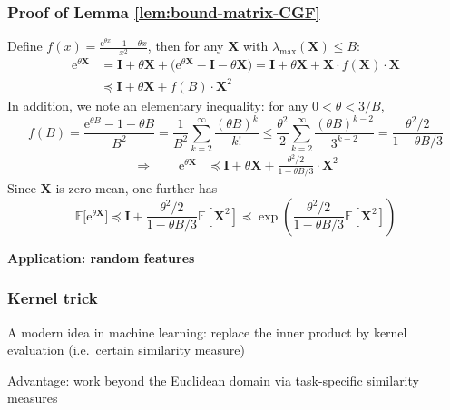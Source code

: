 \documentclass[compress,
mathserif,wide,%
]{beamer}
\begin{document}
\begin{frame}
\frametitle{Proof of Lemma \ref{lem:bound-matrix-CGF}} 

{\small

Define $f(x)=\frac{\mathrm{e}^{\theta x}-1-\theta x}{x^{2}}$, then
for any $\bm{X}$ with $\lambda_{\max}(\bm{X})\leq B$:
\begin{align*}
\mathrm{e}^{\theta\bm{X}} & =\bm{I}+\theta\bm{X}+\big(\mathrm{e}^{\theta\bm{X}}-\bm{I}-\theta\bm{X}\big)=\bm{I}+\theta\bm{X}+\bm{X}\cdot f(\bm{X})\cdot\bm{X}\\
 & \preceq\bm{I}+\theta\bm{X}+f(B)\cdot\bm{X}^{2}
\end{align*}
In addition, we note an elementary inequality: for any $0<\theta<3/B$,
%
\[
f(B)=\frac{\mathrm{e}^{\theta B}-1-\theta B}{B^{2}}=\frac{1}{B^{2}}\sum_{k=2}^{\infty}\frac{(\theta B)^{k}}{k!}\leq\frac{\theta^{2}}{2}\sum_{k=2}^{\infty}\frac{(\theta B)^{k-2}}{3^{k-2}}=\frac{\theta^{2}/2}{1-\theta B/3}
\]
%
\begin{align*}
	\Longrightarrow \qquad \mathrm{e}^{\theta\bm{X}} & \preceq\bm{I}+\theta\bm{X}+\frac{\theta^{2}/2}{1-\theta B/3}\cdot\bm{X}^{2}
\end{align*}
%
Since $\bm{X}$ is zero-mean, one further has
\[
\mathbb{E}\big[\mathrm{e}^{\theta\bm{X}}\big]\preceq\bm{I}+\frac{\theta^{2}/2}{1-\theta B/3}\mathbb{E}[\bm{X}^{2}]\preceq\exp\left(\frac{\theta^{2}/2}{1-\theta B/3}\mathbb{E}[\bm{X}^{2}]\right)
\]

}

\end{frame}





\begin{frame}[plain]

\vfill
\begin{center}
  {\Large\bf Application: random features}
\end{center}

\vfill

\end{frame}



\begin{frame}
\frametitle{Kernel trick} 

A modern idea in machine learning:  replace the inner product by kernel evaluation (i.e.~certain similarity measure)

\bigskip
\bigskip
\bigskip

Advantage: work beyond the Euclidean domain via task-specific similarity measures

\end{frame}
\end{document}
